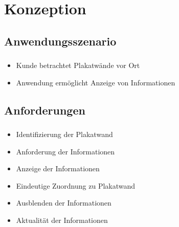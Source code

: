 \documentclass{beamer}
\begin{document}
\section{Konzeption}
\subsection{Anwendungsszenario}
\begin{frame}
    \frametitle{\insertsubsection}
    \begin{itemize}[<+->]
        \item Kunde betrachtet Plakatwände vor Ort
        \item Anwendung ermöglicht Anzeige von Informationen
    \end{itemize}
\end{frame}

\subsection{Anforderungen}
\begin{frame}
    \frametitle{\insertsubsection}
    \begin{itemize}[<+->]
        \item Identifizierung der Plakatwand
        \item Anforderung der Informationen
        \item Anzeige der Informationen  
        \item Eindeutige Zuordnung zu Plakatwand
        \item Ausblenden der Informationen
        \item Aktualität der Informationen
    \end{itemize}
\end{frame}
\end{document}
